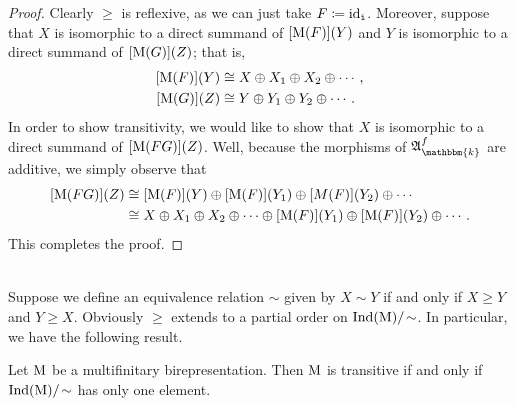 \noindent\begin{proof} Clearly $\geq$ is reflexive, as we can just take $F \coloneqq \textnormal{id}_{\textnormal{\texttt{i}}}$. Moreover, suppose that $X$ is isomorphic to a direct summand of $[\textnormal{M}(F)](Y)$ and $Y$ is isomorphic to a direct summand of $[\textnormal{M}(G)](Z)$; that is,
\begin{align*}
\begin{split}
[\textnormal{M}(F)](Y) &\cong X \oplus X_1 \oplus X_2 \oplus \cdots,\\
[\textnormal{M}(G)](Z) &\cong Y \oplus Y_1 \oplus Y_2 \oplus \cdots.
\end{split}
\end{align*}
\noindent In order to show transitivity, we would like to show that $X$ is isomorphic to a direct summand of $[\textnormal{M}(FG)](Z)$. Well, because the morphisms of $\mathfrak{A}_\mathbbm{k}^f$ are additive, we simply observe that
\begin{align*}
\begin{split}
[\textnormal{M}(FG)](Z) &\cong [\textnormal{M}(F)](Y) \oplus [\textnormal{M}(F)](Y_1) \oplus [M(F)](Y_2) \oplus \cdots\\
&\cong X \oplus X_1 \oplus X_2 \oplus \cdots \oplus [\textnormal{M}(F)](Y_1) \oplus [\textnormal{M}(F)](Y_2) \oplus \cdots.
\end{split}
\end{align*}
\noindent This completes the proof.
\end{proof}\\

\noindent Suppose we define an equivalence relation $\sim$ given by $X \sim Y$ if and only if $X \geq Y$ and $Y \geq X$. Obviously $\geq$ extends to a partial order on $\textnormal{Ind}(\textnormal{M})/\!\sim$. In particular, we have the following result.\newpage

\noindent\begin{proposition}\label{Transitive2} Let $\textnormal{M}$ be a multifinitary birepresentation. Then $\textnormal{M}$ is transitive if and only if\linebreak $\textnormal{Ind}(\textnormal{M})/\!\sim$ has only one element.\\
\end{proposition}

